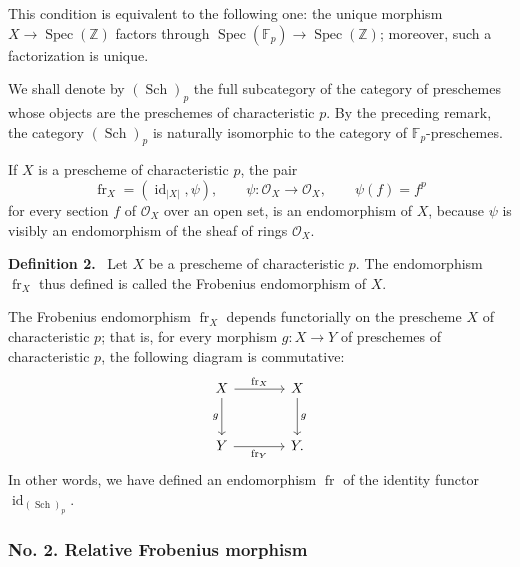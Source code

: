 \documentclass[11pt]{article}
\newenvironment{statement}[1]{\par\medskip\noindent\textbf{#1.}\ }{\par\medskip}
\DeclareMathOperator{\Spec}{Spec}
\providecommand{\OO}{\mathcal{O}}
\providecommand{\id}{\operatorname{id}}
\providecommand{\id}{\operatorname{id}}
\providecommand{\id}{\operatorname{id}}
\providecommand{\id}{\operatorname{id}}
\providecommand{\Spec}{\operatorname{Spec}}
\providecommand{\Spec}{\operatorname{Spec}}
\providecommand{\id}{\operatorname{id}}
\providecommand{\Spec}{\operatorname{Spec}}
\providecommand{\fr}{\operatorname{fr}}
\providecommand{\Sch}{\operatorname{Sch}}
\providecommand{\bF}{\mathbb F}
\providecommand{\bbZ}{\mathbb Z}
\providecommand{\fr}{\operatorname{fr}}
\providecommand{\Sch}{\operatorname{Sch}}
\providecommand{\Spec}{\operatorname{Spec}}
\providecommand{\id}{\operatorname{id}}
\begin{document}
This condition is equivalent to the following one: the unique morphism $X\to\Spec(\bbZ)$ factors through $\Spec(\bF_p)\to\Spec(\bbZ)$; moreover, such a factorization is unique.

We shall denote by $(\Sch)_p$ the full subcategory of the category of preschemes whose objects are the preschemes of characteristic $p$. By the preceding remark, the category $(\Sch)_p$ is naturally isomorphic to the category of $\bF_p$-preschemes.

If $X$ is a prescheme of characteristic $p$, the pair
\[
\fr_X=(\id_{|X|},\psi),
\qquad \psi:\OO_X\longrightarrow\OO_X,
\qquad \psi(f)=f^p
\]
for every section $f$ of $\OO_X$ over an open set, is an endomorphism of $X$, because $\psi$ is visibly an endomorphism of the sheaf of rings $\OO_X$.

\label{sga5:XV:definition:2}\begin{statement}{Definition 2}
Let $X$ be a prescheme of characteristic $p$. The endomorphism $\fr_X$ thus defined is called the Frobenius endomorphism of $X$.
\end{statement}

The Frobenius endomorphism $\fr_X$ depends functorially on the prescheme $X$ of characteristic $p$; that is, for every morphism $g:X\to Y$ of preschemes of characteristic $p$, the following diagram is commutative:
\[
\begin{tikzcd}[column sep=large,row sep=large]
X \arrow[r,"\fr_X"] \arrow[d,"g"'] & X \arrow[d,"g"]\\
Y \arrow[r,"\fr_Y"'] & Y.
\end{tikzcd}
\]
In other words, we have defined an endomorphism $\fr$ of the identity functor $\id_{(\Sch)_p}$.

\subsubsection*{No. 2. Relative Frobenius morphism}
\end{document}
